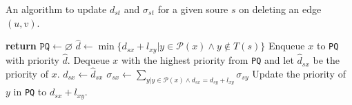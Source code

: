 \begin{algorithm}[tb]
  \caption{An algorithm to update $d_{st}$ and $\sigma_{st}$ for a given soure $s$ on deleting an edge $(u,v)$.}
  \label{alg:decremental-algorithm}
  \begin{algorithmic}[1]\small
    \State \textbf{return}
    \EndIf
    \State $\texttt{PQ}\gets\varnothing$
    \State $\hat{d}\gets\min\{d_{sx}+l_{xy}|y\in\mathcal{P}(x)\land y\notin T(s)\}$
    \State Enqueue $x$ to \texttt{PQ} with priority $\hat{d}$.
    \EndIf
    \EndFor
    \State Dequeue $x$ with the highest priority from \texttt{PQ}
    \State and let $\hat{d}_{sx}$ be the priority of $x$.
    \State $d_{sx}\gets\hat{d}_{sx}$
    \State $\sigma_{sx}\gets\sum_{y|y\in\mathcal{P}(x)\land d_{sx}=d_{sy}+l_{xy}}\sigma_{sy}$
    \State Update the priority of $y$ in \texttt{PQ} to $d_{sx}+l_{xy}$.
    \EndIf
    \EndFor
    \EndWhile
    \EndProcedure
  \end{algorithmic}
\end{algorithm}

